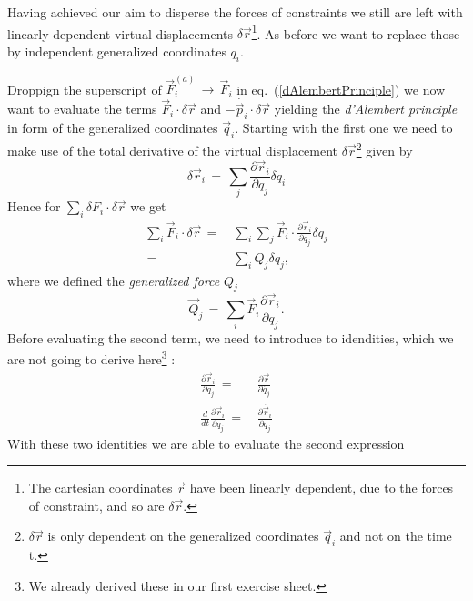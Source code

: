 Having achieved our aim to disperse the forces of constraints we still
are left with linearly dependent virtual displacements $\delta \vec
r$\footnote{The cartesian coordinates $\vec r$ have been linearly dependent,
due to the forces of constraint, and so are $\delta \vec r$.}. As before we
want to replace those by independent generalized coordinates $q_i$.

Droppign the superscript of $\vec F_i^{(a)} \,\to\, \vec F_i$ in
eq.~(\ref{dAlembertPrinciple}) we now want to evaluate the terms $\vec F_i
\cdot \delta \vec r$ and $- \dot{\vec p_i} \cdot \delta \vec r$ yielding the
\textit{d'Alembert principle} in form of the generalized coordinates $\vec
q_i$. Starting with the first one we need to make use of the total derivative
of the virtual displacement $\delta \vec r$\footnote{$\delta \vec r$ is only
dependent on the generalized coordinates $\vec q_i$ and not on the time t.}
given by
\begin{equation}
  \delta \vec r_i \,=\, \sum_j \frac{\partial \vec r_i}{\partial q_j} \delta
q_i 
\end{equation}
Hence for $\sum_i \delta F_i \cdot \delta \vec r$ we get
\begin{equation}
  \label{dAlembertFirst}
  \begin{aligned}
    \sum_i \vec F_i \cdot \delta \vec r \,=\,& \sum_i \sum_j \vec F_i \cdot
\frac{\partial \vec r_i}{\partial q_j} \delta q_j \\
    \,=\,& \sum_i Q_j \delta q_j,
  \end{aligned}
\end{equation}
where we defined the \textit{generalized force} $Q_j$ 
\begin{equation}
  \label{generalizedForce}
  \vec Q_j \,=\, \sum_i \vec F_i \frac{\partial \vec r_i}{\partial q_j}.
\end{equation}
Before evaluating the second term, we need to introduce to
idendities, which we are not going to derive here\footnote{We already derived these in our first exercise sheet.} :
\begin{align}
  \frac{\partial \vec r_i}{\partial q_j} \,=\,& \frac{\partial \dot{\vec r}}{\partial \dot{q_j}} \\
  \frac{d}{dt} \frac{\partial \vec r_i}{\partial q_j} \,=\,& \frac{\partial \dot{\vec r_i}}{\partial q_j}
\end{align}
With these two identities we are able to evaluate the second expression
